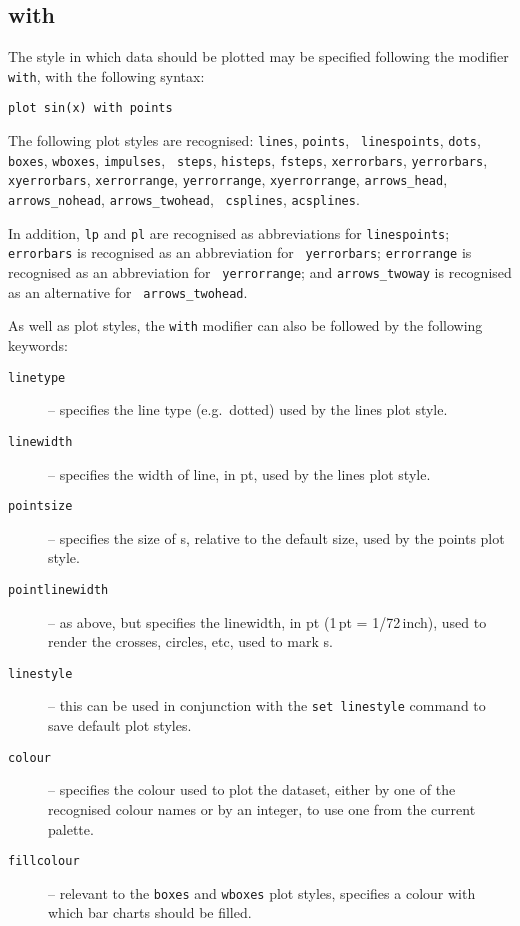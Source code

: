 \subsection{with}

The style in which data should be plotted may be specified following the
modifier {\tt with}, with the following syntax:

\begin{verbatim}
plot sin(x) with points
\end{verbatim}

\label{sec:list_of_plotstyles}
The following plot styles are recognised: {\tt lines}, {\tt points}, {\tt
linespoints}, {\tt dots}, {\tt boxes}, {\tt wboxes}, {\tt impulses}, {\tt
steps}, {\tt histeps}, {\tt fsteps}, {\tt xerrorbars}, {\tt yerrorbars}, {\tt
xyerrorbars}, {\tt xerrorrange}, {\tt yerrorrange}, {\tt xyerrorrange},
\newline\noindent %
{\tt arrows\_head}, {\tt arrows\_nohead}, {\tt arrows\_twohead}, {\tt
csplines}, {\tt acsplines}.

In addition, {\tt lp} and {\tt pl} are recognised as abbreviations
for {\tt linespoints}; {\tt errorbars} is recognised as an abbreviation for {\tt
yerrorbars}; {\tt errorrange} is recognised as an abbreviation for {\tt
yerrorrange}; and {\tt arrows\_twoway} is recognised as an alternative for {\tt
arrows\_twohead}.

As well as plot styles, the {\tt with} modifier can also be followed by the
following keywords:

\begin{description}
\item[{\tt linetype}] -- specifies the line type (e.g.\ dotted) used by the lines plot style. 
\item[{\tt linewidth}] -- specifies the width of line, in pt, used by the lines plot style.
\item[{\tt pointsize}] -- specifies the size of \datapoint s, relative to the
default size, used by the points plot style. 
\item[{\tt pointlinewidth}] -- as above, but specifies the linewidth, in pt (1\,pt = 1/72\,inch),
used to render the crosses, circles, etc, used to mark \datapoint s. 
\item[{\tt linestyle}] -- this can be used in conjunction with the {\tt set linestyle} command to save default plot styles. 
\item[{\tt colour}] -- specifies the colour used to plot the dataset, either by
one of the recognised colour names or by an integer,
to use one from the current palette.  \item[{\tt fillcolour}] -- relevant to the
{\tt boxes} and {\tt wboxes} plot
styles, specifies a colour with which bar charts should be filled.
\end{description}

